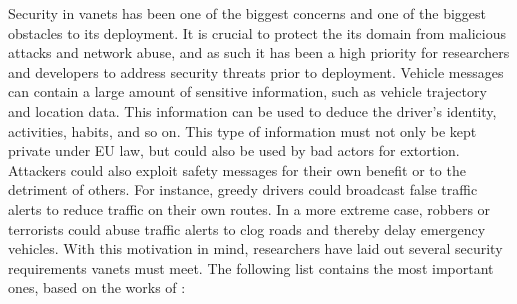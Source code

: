 Security in \glspl{vanet} has been one of the biggest concerns and one of the biggest obstacles to its deployment. It is crucial to protect the \gls{its} domain from malicious attacks and network abuse, and as such it has been a high priority for researchers and developers to address security threats prior to deployment.
Vehicle messages can contain a large amount of sensitive information, such as vehicle trajectory and location data. This information can be used to deduce the driver's identity, activities, habits, and so on. This type of information must not only be kept private under EU law, but could also be used by bad actors for extortion.\cite{liang_vehicular_2015} \cite{malhi_security_2020}
Attackers could also exploit safety messages for their own benefit or to the detriment of others. For instance, greedy drivers could broadcast false traffic alerts to reduce traffic on their own routes. In a more extreme case, robbers or terrorists could abuse traffic alerts to clog roads and thereby delay emergency vehicles. \cite{malhi_security_2020}
With this motivation in mind, researchers have laid out several security requirements \glspl{vanet} must meet. The following list contains the most important ones, based on the works of \cite{hasrouny_vanet_2017} \cite{malhi_security_2020}:
